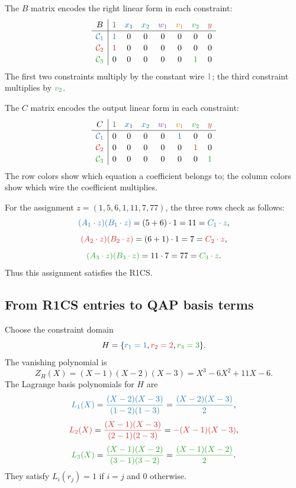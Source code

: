 The $B$ matrix encodes the right linear form in each constraint:
\[
\renewcommand{\arraystretch}{1.15}
\begin{array}{c|ccccccc}
B & \constwire{1} & \xone{x_1} & \xtwo{x_2} & \wone{w_1} & \vone{v_1} & \vtwo{v_2} & \ywire{y} \\
\hline
\rowone{\mathcal C_1} & \rowone{1} & 0 & 0 & 0 & 0 & 0 & 0 \\
\rowtwo{\mathcal C_2} & \rowtwo{1} & 0 & 0 & 0 & 0 & 0 & 0 \\
\rowthree{\mathcal C_3} & 0 & 0 & 0 & 0 & 0 & \rowthree{1} & 0
\end{array}
\]
The first two constraints multiply by the constant wire $\constwire{1}$; the third constraint multiplies by $\vtwo{v_2}$.

The $C$ matrix encodes the output linear form in each constraint:
\[
\renewcommand{\arraystretch}{1.15}
\begin{array}{c|ccccccc}
C & \constwire{1} & \xone{x_1} & \xtwo{x_2} & \wone{w_1} & \vone{v_1} & \vtwo{v_2} & \ywire{y} \\
\hline
\rowone{\mathcal C_1} & 0 & 0 & 0 & 0 & \rowone{1} & 0 & 0 \\
\rowtwo{\mathcal C_2} & 0 & 0 & 0 & 0 & 0 & \rowtwo{1} & 0 \\
\rowthree{\mathcal C_3} & 0 & 0 & 0 & 0 & 0 & 0 & \rowthree{1}
\end{array}
\]
The row colors show which equation a coefficient belongs to; the column colors show which wire the coefficient multiplies.

For the assignment $z=(1,5,6,1,11,7,77)$, the three rows check as follows:
\[
    \rowone{(A_1\cdot z)(B_1\cdot z)}=(5+6)\cdot1=11=\rowone{C_1\cdot z},
\]
\[
    \rowtwo{(A_2\cdot z)(B_2\cdot z)}=(6+1)\cdot1=7=\rowtwo{C_2\cdot z},
\]
\[
    \rowthree{(A_3\cdot z)(B_3\cdot z)}=11\cdot7=77=\rowthree{C_3\cdot z}.
\]
Thus this assignment satisfies the R1CS.

\subsection{From R1CS entries to QAP basis terms}

Choose the constraint domain
\[
    H=\{\rowone{r_1=1},\rowtwo{r_2=2},\rowthree{r_3=3}\}.
\]
The vanishing polynomial is
\[
    Z_H(X)=(X-1)(X-2)(X-3)=X^3-6X^2+11X-6.
\]
The Lagrange basis polynomials for $H$ are
\[
    \rowone{L_1(X)}=\rowone{\frac{(X-2)(X-3)}{(1-2)(1-3)}}=\rowone{\frac{(X-2)(X-3)}{2}},
\]
\[
    \rowtwo{L_2(X)}=\rowtwo{\frac{(X-1)(X-3)}{(2-1)(2-3)}}=\rowtwo{-(X-1)(X-3)},
\]
\[
    \rowthree{L_3(X)}=\rowthree{\frac{(X-1)(X-2)}{(3-1)(3-2)}}=\rowthree{\frac{(X-1)(X-2)}{2}}.
\]
They satisfy $L_i(r_j)=1$ if $i=j$ and $0$ otherwise.

